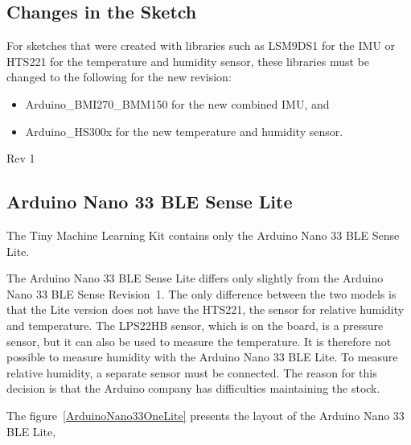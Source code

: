 \subsection{Changes in the Sketch}


For sketches that were created with libraries such as LSM9DS1 for the IMU or HTS221 for the temperature and humidity sensor, these libraries must be changed to the following for the new revision: 

\begin{itemize}
    \item Arduino\_BMI270\_BMM150 for the new combined IMU, and
    \item Arduino\_HS300x for the new temperature and humidity sensor.
\end{itemize}

\bigskip

Rev 1


\subsection{Arduino Nano 33 BLE Sense Lite}


The Tiny Machine Learning Kit contains only the Arduino Nano 33 BLE Sense Lite. 

\bigskip



\bigskip

The Arduino Nano 33 BLE Sense Lite differs only slightly from the Arduino Nano 33 BLE Sense Revision~1. The only difference between the two models is that the Lite version does not have the HTS221, the sensor for relative humidity and temperature. The LPS22HB sensor, which is on the board, is a pressure sensor, but it can also be used to measure the temperature. It is therefore not possible to measure humidity with the Arduino Nano 33 BLE Lite. To measure relative humidity, a separate sensor must be connected. The reason for this decision is that the Arduino company has difficulties maintaining the stock. \cite{Filipi:2022}




The figure~\ref{ArduinoNano33OneLite} presents the  layout of the Arduino Nano 33 BLE Lite,

